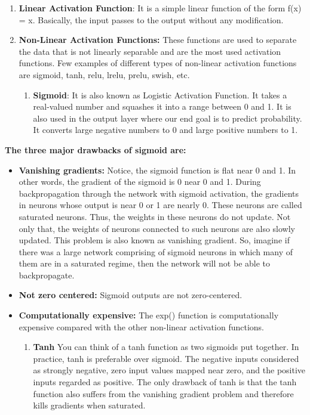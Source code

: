 \documentclass[11pt]{article}
\providecommand{\tightlist}{%
      \setlength{\itemsep}{0pt}\setlength{\parskip}{0pt}}
\begin{document}
\begin{enumerate}
\def\labelenumi{\arabic{enumi}.}
\tightlist
\item
  \textbf{Linear Activation Function}: It is a simple linear function of
  the form f(x) = x. Basically, the input passes to the output without
  any modification.
\item
  \textbf{Non-Linear Activation Functions:} These functions are used to
  separate the data that is not linearly separable and are the most used
  activation functions. Few examples of different types of non-linear
  activation functions are sigmoid, tanh, relu, lrelu, prelu, swish,
  etc.

  \begin{enumerate}
  \def\labelenumii{\arabic{enumii}.}
  \tightlist
  \item
    \textbf{Sigmoid}: It is also known as Logistic Activation Function.
    It takes a real-valued number and squashes it into a range between 0
    and 1. It is also used in the output layer where our end goal is to
    predict probability. It converts large negative numbers to 0 and
    large positive numbers to 1.
  \end{enumerate}
\end{enumerate}

\textbf{The three major drawbacks of sigmoid are:}

\begin{itemize}
\item
  \textbf{Vanishing gradients:} Notice, the sigmoid function is flat
  near 0 and 1. In other words, the gradient of the sigmoid is 0 near 0
  and 1. During backpropagation through the network with sigmoid
  activation, the gradients in neurons whose output is near 0 or 1 are
  nearly 0. These neurons are called saturated neurons. Thus, the
  weights in these neurons do not update. Not only that, the weights of
  neurons connected to such neurons are also slowly updated. This
  problem is also known as vanishing gradient. So, imagine if there was
  a large network comprising of sigmoid neurons in which many of them
  are in a saturated regime, then the network will not be able to
  backpropagate.
\item
  \textbf{Not zero centered:} Sigmoid outputs are not zero-centered.
\item
  \textbf{Computationally expensive:} The exp() function is
  computationally expensive compared with the other non-linear
  activation functions.

  \begin{enumerate}
  \def\labelenumi{\arabic{enumi}.}
  \setcounter{enumi}{1}
  \tightlist
  \item
    \textbf{Tanh} You can think of a tanh function as two sigmoids put
    together. In practice, tanh is preferable over sigmoid. The negative
    inputs considered as strongly negative, zero input values mapped
    near zero, and the positive inputs regarded as positive. The only
    drawback of tanh is that the tanh function also suffers from the
    vanishing gradient problem and therefore kills gradients when
    saturated.
  \end{enumerate}
\end{itemize}
\end{document}

